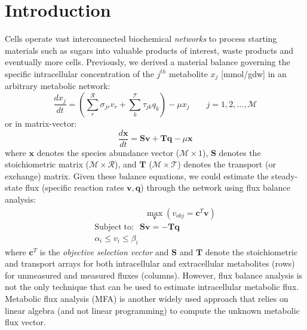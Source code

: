 \documentclass[11pt]{article}
\theoremstyle{definition}
\begin{document}
\section*{Introduction}
Cells operate vast interconnected biochemical \textit{networks} to process starting materials such as sugars into valuable products of interest, waste products and eventually more cells.
Previously, we derived a material balance governing the specific intracellular concentration of the $j^{th}$ metabolite $x_{j}$ [mmol/gdw] in an arbitrary metabolic network:
\begin{equation}\label{eqn-final-mass-balance}
	\frac{dx_{j}}{dt} = \left(\displaystyle\sum_{r}^{\mathcal{R}}\sigma_{jr}v_{r} + \displaystyle\sum_{k}^{\mathcal{T}}\tau_{jk}q_{k}\right) - \mu x_{j}
	\qquad{j=1,2,\hdots,\mathcal{M}}
\end{equation}or in matrix-vector:
\begin{equation}
	\frac{d\mathbf{x}}{dt} = \mathbf{S}\mathbf{v} + \mathbf{T}\mathbf{q} -\mu\mathbf{x}
\end{equation}where $\mathbf{x}$ denotes the species abundance vector ($\mathcal{M}\times{1}$), $\mathbf{S}$ denotes the stoichiometric matrix ($\mathcal{M}\times{\mathcal{R}}$),
and $\mathbf{T}$ ($\mathcal{M}\times{\mathcal{T}}$) denotes the transport (or exchange) matrix.
Given these balance equations, we could estimate the steady-state flux (specific reaction rates $\mathbf{v}, \mathbf{q}$) through the network using flux balance analysis:
\begin{equation}
\begin{multlined}
	\qquad \qquad \qquad \max_{\boldsymbol{v}}{} \! \left( v_{obj} = \mathbf{c}^T \boldsymbol{v} \right) \\
	\mathrm{Subject \; to:}
	 \; \; \mathbf{S}\mathbf{v}=-\mathbf{Tq} \\
\alpha_i \leq v_i \leq \beta_i  \qquad
\end{multlined}
\end{equation}
where $\mathbf{c}^{T}$ is the \textit{objective selection vector} and $\mathbf{S}$ and $\mathbf{T}$ denote the stoichiometric and transport arrays for both intracellular and extracellular metabolites (rows)
for unmeasured and measured fluxes (columns).
However, flux balance analysis is not the only technique that can be used to estimate intracellular metabolic flux.
Metabolic flux analysis (MFA) is another widely used approach that relies on linear algebra (and not linear programming) to compute the unknown metabolic flux vector.
\end{document}
